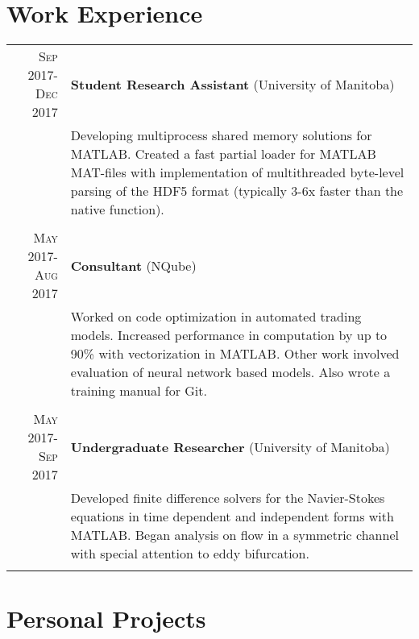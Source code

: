 \documentclass[letter,10pt]{article} %
\begin{document}
\section{Work Experience}
\begin{tabular}{r|p{9.5cm}}
\textsc{Sep} 2017-\textsc{Dec} 2017 & \textbf{Student Research Assistant} (University of Manitoba) \\ 
& \footnotesize{Developing multiprocess shared memory solutions for MATLAB. Created a fast partial loader for MATLAB MAT-files with implementation of multithreaded byte-level parsing of the HDF5 format (typically 3-6x faster than the native function).}\\
\multicolumn{2}{c}{} \\


\textsc{May} 2017-\textsc{Aug} 2017 & \textbf{Consultant} (NQube)\\
& \footnotesize{Worked on code optimization in automated trading models. Increased performance in computation by up to 90\% with vectorization in MATLAB. Other work involved evaluation of neural network based models. Also wrote a training manual for Git.}\\
\multicolumn{2}{c}{} \\


\textsc{May} 2017-\textsc{Sep} 2017 & \textbf{Undergraduate Researcher} (University of Manitoba)\\
& \footnotesize{Developed finite difference solvers for the Navier-Stokes equations in time dependent and independent forms with MATLAB. Began analysis on flow in a symmetric channel with special attention to eddy bifurcation.}\\
\multicolumn{2}{c}{} \\
\end{tabular}



\section{Personal Projects}
\end{document}

